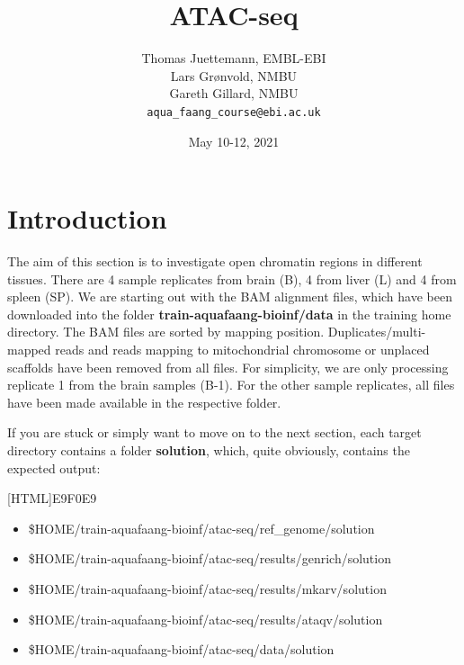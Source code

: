 \documentclass[12pt]{article}
\begin{document}
	
	\title{ATAC-seq} 
	\author{Thomas Juettemann, EMBL-EBI\\
		Lars Gr\o nvold, NMBU\\	
		Gareth Gillard, NMBU\\
		\texttt{aqua\_faang\_course@ebi.ac.uk}}  %
	\date{May 10-12, 2021}  %
	\maketitle
	
	
	
	
	\section{Introduction}
	The aim of this section  is to investigate open chromatin regions in different tissues.  
	There are 4 sample replicates from brain (B), 4 from liver (L) and 4 from spleen (SP). 
	We are starting out with the BAM alignment files, which have been downloaded into the folder \textbf{train-aquafaang-bioinf/data} in the training home directory. 
	The BAM files are sorted by mapping position. 
	Duplicates/multi-mapped reads and reads mapping to mitochondrial chromosome or unplaced scaffolds have been removed from all files.
	For simplicity, we are only processing replicate 1 from the brain samples (B-1). 
	For the other sample replicates, all files have been made available in the respective folder.
	
	If you are stuck or simply want to move on to the next section, each target directory contains a folder  \textbf{solution}, which, quite obviously, contains the expected output:

	\vspace{0.5cm}

	[HTML]{E9F0E9}{\parbox{\linewidth}{%
			\begin{itemize}
				\item \$HOME/train-aquafaang-bioinf/atac-seq/ref\_genome/solution
				\item \$HOME/train-aquafaang-bioinf/atac-seq/results/genrich/solution
				\item \$HOME/train-aquafaang-bioinf/atac-seq/results/mkarv/solution
				\item \$HOME/train-aquafaang-bioinf/atac-seq/results/ataqv/solution
				\item \$HOME/train-aquafaang-bioinf/atac-seq/data/solution
			\end{itemize}
	}}
\end{document}
